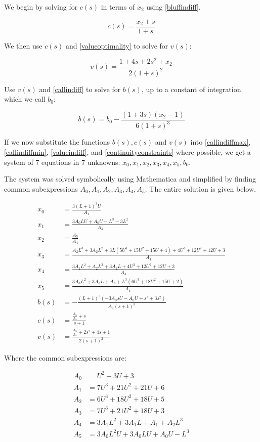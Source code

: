 \documentclass[a4paper,12pt]{article}
\begin{document}
We begin by solving for $c(s)$ in terms of $x_2$ using \ref{bluffindiff}. 

\[ c(s) = \frac{x_2 + s}{1+s} \]

We then use $c(s)$ and \ref{valueoptimality} to solve for $v(s)$:

\[ v(s) = \frac{1+4s+2s^2+x_2}{2(1+s)^2} \]

Use $v(s)$ and \ref{callindiff} to solve for $b(s)$, up to a constant of integration which we call $b_0$:

\[ b(s) = b_0 - \frac{(1+3s)(x_2-1)}{6(1+s)^3} \]

If we now substitute the functions $b(s), c(s)$ and $v(s)$ into \ref{callindiffmax}, \ref{callindiffmin}, \ref{valueindiff}, and \ref{continuityconstraints} where possible, we get a system of 7 equations in 7 unknowns: $x_0, x_1, x_2, x_3, x_4, x_5, b_0$. 

The system was solved symbolically using Mathematica and simplified by finding common subexpressions $A_0, A_1, A_2, A_3, A_4, A_5$. The entire solution is given below.

\begin{align*}
    x_0 &= \frac{3 (L+1)^3 U}{A_4}\\
    x_1 &= \frac{3 A_0 L U+A_0 U-L^3-3 L^2}{A_4}\\
    x_2 &= \frac{A_5}{A_4}\\
    x_3 &= \frac{A_2 L^3+3 A_2 L^2+3 L \left(5 U^3+15 U^2+15 U+4\right)+4 U^3+12 U^2+12 U+3}{A_4}\\
    x_4 &= \frac{3 A_1 L^2+A_2 L^3+3 A_2 L+4 U^3+12 U^2+12 U+3}{A_4}\\
    x_5 &= \frac{3 A_3 L^2+3 A_3 L+A_3+L^3 \left(6 U^3+18 U^2+15 U+2\right)}{A_4}\\
    b(s) &= -\frac{(L+1)^3 \left(-3 A_0 s U-A_0 U+s^3+3 s^2\right)}{A_4 (s+1)^3}\\
    c(s) &= \frac{\frac{A_5}{A_4}+s}{s+1}\\
    v(s) &= \frac{\frac{A_5}{A_4}+2 s^2+4 s+1}{2 (s+1)^2}
\end{align*}


Where the common subexpressions are:

\begin{align*}
	A_0 &= U^2+3 U+3 \\
    A_1 &= 7 U^3+21 U^2+21 U+6 \\
    A_2 &= 6 U^3+18 U^2+18 U+5 \\
    A_3 &= 7 U^3+21 U^2+18 U+3 \\
    A_4 &= 3 A_1 L^2+3 A_1 L+A_1+A_2 L^3 \\
    A_5 &= 3 A_0 L^2 U+3 A_0 L U+A_0 U-L^3
\end{align*}
\end{document}
